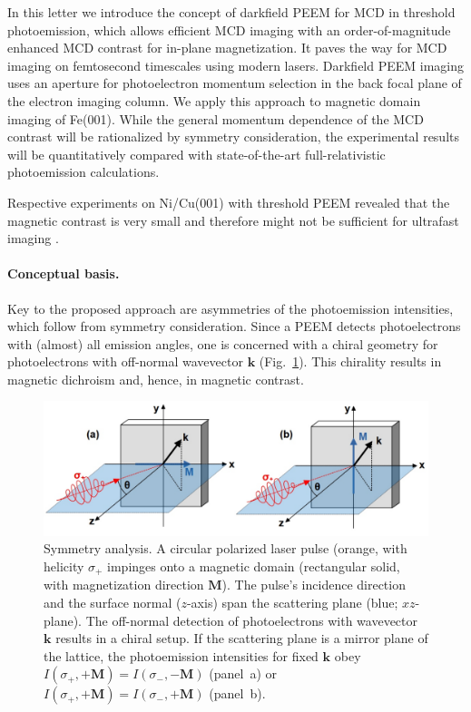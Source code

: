 \documentclass[prl,twocolumn,floatfix]{revtex4-2}
\renewcommand{\vec}[1]{\boldsymbol{#1}}
\begin{document}


In this letter we introduce the concept of darkfield PEEM for MCD in threshold photoemission, which allows efficient MCD imaging with an order-of-magnitude enhanced MCD contrast for in-plane magnetization. It paves the way for MCD imaging on femtosecond timescales using modern lasers.
Darkfield PEEM imaging uses an aperture for photoelectron momentum selection in the back focal plane of the electron imaging column. We apply this approach to magnetic domain imaging of Fe(001). While the general momentum dependence of the MCD contrast will be rationalized by symmetry consideration, the experimental results will be quantitatively compared with state-of-the-art full-relativistic photoemission calculations.

Respective experiments on Ni/Cu(001) with threshold PEEM revealed that the magnetic contrast is very small and therefore might not be sufficient for ultrafast imaging .


\paragraph{Conceptual basis.} Key to the proposed approach are asymmetries of the photoemission intensities, which follow from symmetry consideration. Since a PEEM detects photoelectrons with (almost) all emission angles, one is concerned with a chiral geometry for photoelectrons with off-normal wavevector $\vec{k}$ (Fig.~\ref{fig:symmetry}). This chirality results in magnetic dichroism and, hence, in magnetic contrast.

\begin{figure}
    \centering
    \includegraphics[width = \columnwidth]{symmetry}
    \caption{Symmetry analysis. A circular polarized laser pulse (orange, with helicity $\sigma_{+}$ impinges onto a magnetic domain (rectangular solid, with magnetization direction $\vec{M}$). The pulse's incidence direction and the surface normal ($z$-axis) span the scattering plane (blue; $xz$-plane). The off-normal detection of photoelectrons with wavevector $\vec{k}$ results in a chiral setup. If the scattering plane is a mirror plane of the lattice, the photoemission intensities for fixed $\vec{k}$ obey $I(\sigma_{+}, +\vec{M}) = I(\sigma_{-}, -\vec{M})$ (panel~a) or $I(\sigma_{+}, +\vec{M}) = I(\sigma_{-}, +\vec{M})$ (panel~b).}
    \label{fig:symmetry}
\end{figure}
\end{document}
